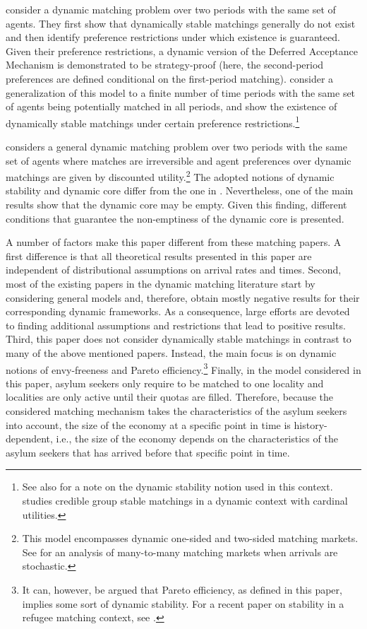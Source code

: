 \documentclass[12pt,fleqn]{article}
\begin{document}
\citet{bib:KadamEtAl2018a} consider a dynamic matching problem over two periods with the same set of agents. They first show that dynamically stable matchings generally do not exist and then identify preference restrictions under which existence is guaranteed. Given their preference restrictions, a dynamic version of the Deferred Acceptance Mechanism is demonstrated to be strategy-proof (here, the second-period preferences are defined conditional on the first-period matching). \citet{bib:KadamEtAl2018b} consider a generalization of this model to a finite number of time periods with the same set of agents being potentially matched in all periods, and show the existence of dynamically stable matchings under certain preference restrictions.\footnote{See also \citet{bib:Kotowski} for a note on the dynamic stability notion used in this context. \citet{bib:Kurino} studies credible group stable matchings in a dynamic context with cardinal utilities.}

\citet{bib:Doval2017} considers a general dynamic matching problem over two periods with the same set of agents where matches are irreversible and agent preferences over dynamic matchings are given by discounted utility.\footnote{This model encompasses dynamic one-sided and two-sided matching markets. See \citet{bib:Doval2016} for an analysis of many-to-many matching markets when arrivals are stochastic.} The adopted notions of dynamic stability and dynamic core differ from the one in \citet{bib:KadamEtAl2018a,bib:KadamEtAl2018b}. Nevertheless, one of the main results show that the dynamic core may be empty. Given this finding, different conditions that guarantee the non-emptiness of the dynamic core is presented.

A number of factors make this paper different from these matching papers. A first difference is that all theoretical results presented in this paper are independent of distributional assumptions on arrival rates and times. Second, most of the existing papers in the dynamic matching literature start by considering general models and, therefore, obtain mostly negative results for their corresponding dynamic frameworks. As a consequence, large efforts are devoted to finding additional assumptions and restrictions that lead to positive results. Third, this paper does not consider dynamically stable matchings in contrast to many of the above mentioned papers. Instead, the main focus is on dynamic notions of envy-freeness and Pareto efficiency.\footnote{It can, however, be argued that Pareto efficiency, as defined in this paper, implies some sort of dynamic stability. For a recent paper on stability in a refugee matching context, see \citet{bib:AzizEtAl2017}.} Finally, in the model considered in this paper, asylum seekers only require to be matched to one locality and localities are only active until their quotas are filled. Therefore, because the considered matching mechanism takes the characteristics of the asylum seekers into account, the size of the economy at a specific point in time is history-dependent, i.e., the size of the economy depends on the characteristics of the asylum seekers that has arrived before that specific point in time.
\end{document}
